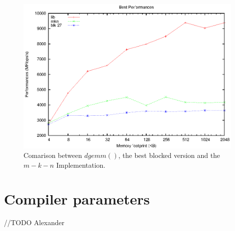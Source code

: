 \begin{figure}[here]
\centering
\includegraphics[width=\textwidth]{results/3way.eps}
\caption{Comarison between $dgemm()$, the best blocked version and the $m-k-n$ Implementation.}
\label{fig:3way}
\end{figure}

\section{Compiler parameters}

//TODO Alexander



